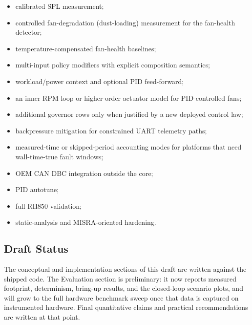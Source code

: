 \begin{itemize}[leftmargin=*]
    \item calibrated SPL measurement;
    \item controlled fan-degradation (dust-loading) measurement for the fan-health detector;
    \item temperature-compensated fan-health baselines;
    \item multi-input policy modifiers with explicit composition semantics;
    \item workload/power context and optional PID feed-forward;
    \item an inner RPM loop or higher-order actuator model for PID-controlled fans;
    \item additional governor rows only when justified by a new deployed control law;
    \item backpressure mitigation for constrained UART telemetry paths;
    \item measured-time or skipped-period accounting modes for platforms that need wall-time-true fault windows;
    \item OEM CAN DBC integration outside the core;
    \item PID autotune;
    \item full RH850 validation;
    \item static-analysis and MISRA-oriented hardening.
\end{itemize}

\subsection{Draft Status}

The conceptual and implementation sections of this draft are written against the shipped code. The Evaluation section is preliminary: it now reports measured footprint, determinism, bring-up results, and the closed-loop scenario plots, and will grow to the full hardware benchmark sweep once that data is captured on instrumented hardware. Final quantitative claims and practical recommendations are written at that point.

\endinput
